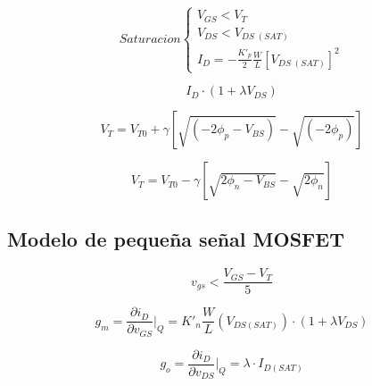 \begin{equation*}
    Saturacion\begin{cases}
    V_{GS} < V_T \\
    V_{DS} < V_{DS\;(SAT)} \\
    I_D = -\frac{K'_p}{2}\frac{W}{L}\left[V_{DS\;(SAT)}\right]^2
\end{cases}
\end{equation*}

\begin{equation*}
    I_D \cdot (1+\lambda V_{DS})
\end{equation*}

\begin{equation}
    V_{T} = V_{T0} + \gamma{\left[\sqrt{\left(-2\phi_p - V_{BS}\right)} - \sqrt{\left( -2\phi_p\right)}  \right]} 
\end{equation}

\begin{equation}
    V_{T} = V_{T0} - \gamma{\left[\sqrt{2\phi_n - V_{BS}} - \sqrt{2\phi_n}\right]} 
\end{equation}

\subsection{Modelo de pequeña señal MOSFET}

\begin{equation*}
    v_{gs} < \frac{V_{GS} - V_T}{5}
\end{equation*}

\begin{equation}
    g_m = \frac{\partial i_D}{\partial v_{GS}} \Bigg|_Q = K'_n\frac{W}{L}\left(V_{DS(SAT)}\right) \cdot (1+\lambda V_{DS})
\end{equation}

\begin{equation}
    g_o = \frac{\partial i_D}{\partial v_{DS}} \Bigg|_Q = \lambda \cdot I_{D(SAT)}
\end{equation}
